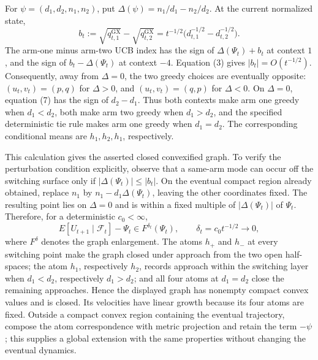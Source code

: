 For \(\psi=(d_1,d_2,n_1,n_2)\), put \(\Delta(\psi)=n_1/d_1-n_2/d_2\).  At the current normalized state,
\[
 b_t:=\sqrt{q^{\mathrm{GX}}_{t,1}}-\sqrt{q^{\mathrm{GX}}_{t,2}}
 =t^{-1/2}\bigl(d_{t,1}^{-1/2}-d_{t,2}^{-1/2}\bigr). \tag{7}
\]
The arm-one minus arm-two UCB index has the sign of \(\Delta(\Psi_t)+b_t\) at context \(1\), and the sign of \(b_t-\Delta(\Psi_t)\) at context \(-4\).  Equation (3) gives \(|b_t|=O(t^{-1/2})\).  Consequently, away from \(\Delta=0\), the two greedy choices are eventually opposite: \((u_t,v_t)=(p,q)\) for \(\Delta>0\), and \((u_t,v_t)=(q,p)\) for \(\Delta<0\).  On \(\Delta=0\), equation (7) has the sign of \(d_2-d_1\).  Thus both contexts make arm one greedy when \(d_1<d_2\), both make arm two greedy when \(d_1>d_2\), and the specified deterministic tie rule makes arm one greedy when \(d_1=d_2\).  The corresponding conditional means are \(h_1,h_2,h_1\), respectively.

This calculation gives the asserted closed convexified graph.  To verify the perturbation condition explicitly, observe that a same-arm mode can occur off the switching surface only if \(|\Delta(\Psi_t)|\leq |b_t|\).  On the eventual compact region already obtained, replace \(n_1\) by \(n_1-d_1\Delta(\Psi_t)\), leaving the other coordinates fixed.  The resulting point lies on \(\Delta=0\) and is within a fixed multiple of \(|\Delta(\Psi_t)|\) of \(\Psi_t\).  Therefore, for a deterministic \(c_0<\infty\),
\[
 E[U_{t+1}\mid\mathcal F_t]-\Psi_t\in F^{\delta_t}(\Psi_t),
 \qquad \delta_t=c_0t^{-1/2}\longrightarrow0, \tag{8}
\]
where \(F^\delta\) denotes the graph enlargement.  The atoms \(h_+\) and \(h_-\) at every switching point make the graph closed under approach from the two open half-spaces; the atom \(h_1\), respectively \(h_2\), records approach within the switching layer when \(d_1<d_2\), respectively \(d_1>d_2\); and all four atoms at \(d_1=d_2\) close the remaining approaches.  Hence the displayed graph has nonempty compact convex values and is closed.  Its velocities have linear growth because its four atoms are fixed.  Outside a compact convex region containing the eventual trajectory, compose the atom correspondence with metric projection and retain the term \(-\psi\); this supplies a global extension with the same properties without changing the eventual dynamics.

